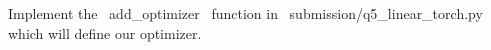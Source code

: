 \item {}
Implement the ~add_optimizer~ function in ~submission/q5_linear_torch.py~ which will define our optimizer.